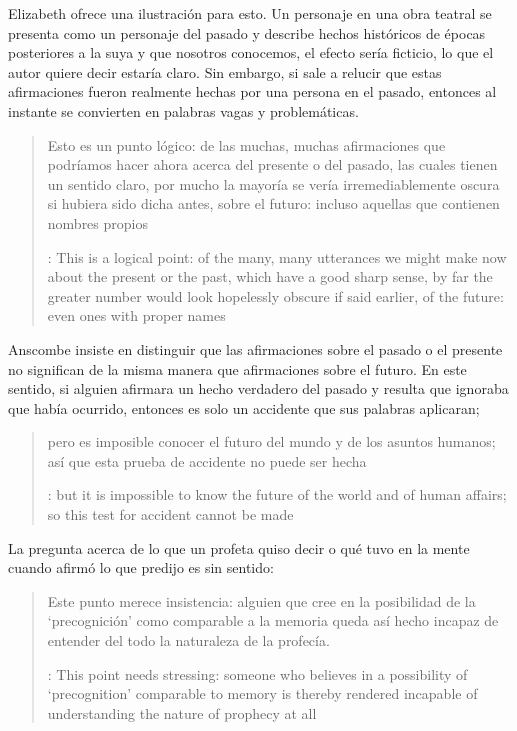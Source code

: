 Elizabeth ofrece una ilustración para esto. Un personaje en una obra teatral se
presenta como un personaje del pasado y describe hechos históricos de épocas
posteriores a la suya y que nosotros conocemos, el efecto sería ficticio, lo que
el autor quiere decir estaría claro. Sin embargo, si sale a relucir que estas
afirmaciones fueron realmente hechas por una persona en el pasado, entonces al
instante se convierten en palabras vagas y problemáticas.
\blockquote[{\cite[31]{anscombe2008faith:prophandmi}}: This is a logical point:
of the many, many utterances we might make now about the present or the past,
which have a good sharp sense, by far the greater number would look hopelessly
obscure if said earlier, of the future: even ones with proper names]{Esto es un
  punto lógico: de las muchas, muchas afirmaciones que podríamos hacer ahora
  acerca del presente o del pasado, las cuales tienen un sentido claro, por
  mucho la mayoría se vería irremediablemente oscura si hubiera sido dicha
  antes, sobre el futuro: incluso aquellas que contienen nombres propios}
Anscombe insiste en distinguir que las afirmaciones sobre el pasado o el
presente no significan de la misma manera que afirmaciones sobre el futuro. En
este sentido, si alguien afirmara un hecho verdadero del pasado y resulta que
ignoraba que había ocurrido, entonces es solo un accidente que sus palabras
aplicaran; \blockquote[{\cite[29]{anscombe2008faith:prophandmi}}: but it is
impossible to know the future of the world and of human affairs; so this test
for accident cannot be made]{pero es imposible conocer el futuro del mundo y de
  los asuntos humanos; así que esta prueba de accidente no puede ser hecha}. La
pregunta acerca de lo que un profeta quiso decir o qué tuvo en la mente cuando
afirmó lo que predijo es sin sentido:
\blockquote[{\cite[29]{anscombe2008faith:prophandmi}}: This point needs
stressing: someone who believes in a possibility of `precognition' comparable to
memory is thereby rendered incapable of understanding the nature of prophecy at
all]{Este punto merece insistencia: alguien que cree en la posibilidad de la
  `precognición' como comparable a la memoria queda así hecho incapaz de
  entender del todo la naturaleza de la profecía.}

